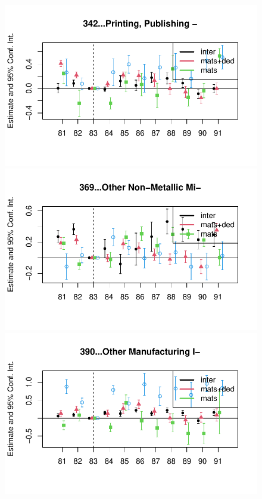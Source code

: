 \documentclass[
  12pt]{article}
\theoremstyle{definition}
\theoremstyle{remark}
\begin{document}
\begin{figure}
\begin{minipage}{\linewidth}
\includegraphics{Tax-Prod_files/figure-pdf/unnamed-chunk-11-10.pdf}

\includegraphics{Tax-Prod_files/figure-pdf/unnamed-chunk-11-11.pdf}

\includegraphics{Tax-Prod_files/figure-pdf/unnamed-chunk-11-12.pdf}


\end{minipage}
\end{figure}
\end{document}
